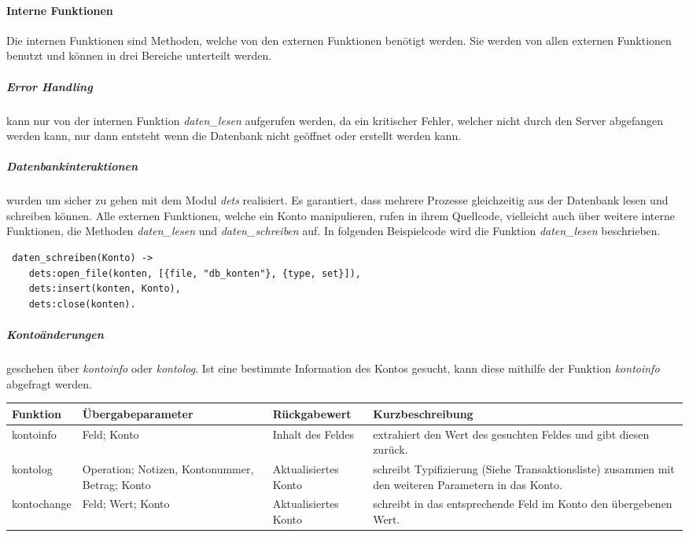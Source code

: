 \paragraph{Interne Funktionen}
Die internen Funktionen sind Methoden, welche von den externen Funktionen benötigt werden. Sie werden von allen externen Funktionen benutzt und können in drei Bereiche unterteilt werden.
\subparagraph{Error Handling}
 kann nur von der internen Funktion \textit{daten\_lesen} aufgerufen werden, da ein kritischer Fehler, welcher nicht durch den Server abgefangen werden kann, nur dann entsteht wenn die Datenbank nicht geöffnet oder erstellt werden kann.
\subparagraph{Datenbankinteraktionen} wurden um sicher zu gehen mit dem Modul \textit{dets} realisiert. Es garantiert, dass mehrere Prozesse gleichzeitig aus der Datenbank lesen und schreiben können. Alle externen Funktionen, welche ein Konto manipulieren, rufen in ihrem Quellcode, vielleicht auch über weitere interne Funktionen, die Methoden \textit{daten\_lesen} und \textit{daten\_schreiben} auf. In folgenden Beispielcode wird die Funktion \textit{daten\_lesen} beschrieben.
\begin{lstlisting}
 daten_schreiben(Konto) -> 
 	dets:open_file(konten, [{file, "db_konten"}, {type, set}]),
 	dets:insert(konten, Konto),
 	dets:close(konten).	
\end{lstlisting}
\subparagraph{Kontoänderungen} geschehen über \textit{kontoinfo} oder \textit{kontolog}. Ist eine bestimmte Information des Kontos gesucht, kann diese mithilfe der Funktion \textit{kontoinfo} abgefragt werden.
\\
\begin{center}
\begin{tabular}{p{3 cm}|p{3 cm}|p{3 cm}|p{5 cm}}
Funktion & Übergabeparameter & Rückgabewert & Kurzbeschreibung \\
				\hline
				\hline
kontoinfo & 
Feld; Konto & 
Inhalt des Feldes & 
extrahiert den Wert des gesuchten Feldes und gibt diesen zurück.\\ \hline

kontolog & 
Operation; {Notizen, Kontonummer, Betrag}; Konto & 
Aktualisiertes Konto & 
schreibt Typifizierung (Siehe Transaktionsliste) zusammen mit den weiteren Parametern in das Konto.\\ \hline

kontochange & 
Feld; Wert; Konto & 
Aktualisiertes Konto & 
schreibt in das entsprechende Feld im Konto den übergebenen Wert.\\ \hline
\end{tabular}\\
\end{center}
